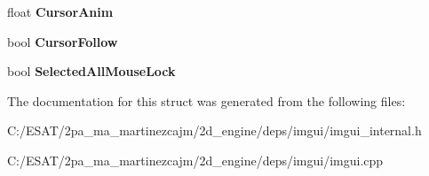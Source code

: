 \begin{DoxyCompactItemize}
\mbox{\label{struct_im_gui_text_edit_state_a743c35c5d6559183f41e09e32ae967f4}} 
float {\bfseries Cursor\+Anim}
\item 
\mbox{\label{struct_im_gui_text_edit_state_add85da462dc5bbb0295ae28ebec2ec5d}} 
bool {\bfseries Cursor\+Follow}
\item 
\mbox{\label{struct_im_gui_text_edit_state_adee23632ed1703c731651b163c1f481c}} 
bool {\bfseries Selected\+All\+Mouse\+Lock}
\end{DoxyCompactItemize}


The documentation for this struct was generated from the following files\+:\begin{DoxyCompactItemize}
\item 
C\+:/\+E\+S\+A\+T/2pa\+\_\+ma\+\_\+martinezcajm/2d\+\_\+engine/deps/imgui/imgui\+\_\+internal.\+h\item 
C\+:/\+E\+S\+A\+T/2pa\+\_\+ma\+\_\+martinezcajm/2d\+\_\+engine/deps/imgui/imgui.\+cpp\end{DoxyCompactItemize}
